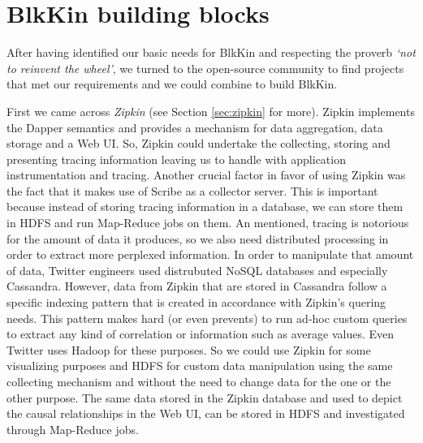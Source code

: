 \section{BlkKin building blocks}\label{sec:components}

After having identified our basic needs for BlkKin and respecting the proverb
\textit{`not to reinvent the wheel'}, we turned to the open-source community to
find projects that met our requirements and we could combine to build BlkKin.

First we came across \textit{Zipkin} (see Section \ref{sec:zipkin} for more).
Zipkin implements the Dapper semantics and provides a mechanism for data
aggregation, data storage and a Web UI. So, Zipkin could undertake the
collecting, storing and presenting tracing information leaving us to handle with
application instrumentation and tracing. Another crucial factor in favor of
using Zipkin was the fact that it makes use of Scribe as a collector server.
This is important because instead of storing tracing information in a database,
we can store them in HDFS and run Map-Reduce jobs on them. An mentioned, tracing
is notorious for the amount of data it produces, so we also need distributed
processing in order to extract more perplexed information. In order to
manipulate that amount of data, Twitter engineers used distrubuted NoSQL
databases and especially Cassandra. However, data from Zipkin that are stored in
Cassandra follow a specific indexing pattern that is created in accordance with
Zipkin's quering needs. This pattern makes hard (or even prevents) to run ad-hoc
custom queries to extract any kind of correlation or information such as average
values. Even Twitter uses Hadoop for these purposes.  So we could use Zipkin for
some visualizing purposes and HDFS for custom data manipulation using the same
collecting mechanism and without the need to change data for the one or the
other purpose. The same data stored in the Zipkin database and used to depict
the causal relationships in the Web UI, can be stored in HDFS and investigated
through Map-Reduce jobs.  

